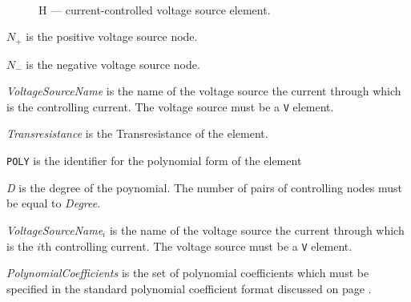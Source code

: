 
\begin{figure}[h]
\centering
\ 
\caption{H --- current-controlled voltage source element.}
\end{figure}


\begin{widelist}
\item[$N_{+}$] is the positive voltage source node.
\item[$N_{-}$] is the negative voltage source node.
\item[{\it VoltageSourceName}] is the name of the voltage source the current
through which is the controlling current. The voltage source must be a {\tt V}
element.
\item[{\it Transresistance}] is the Transresistance of the element.
\item[{\tt POLY}] is the identifier for the polynomial form of the element
\item[{\it D}] is the degree of the poynomial. The number of pairs of
           controlling nodes must be equal to {\it Degree}.
\item[{\it VoltageSourceName$_i$}] is the name of the voltage source the current
through which is the $i$th controlling current.
The voltage source must be a {\tt V} element.
\item[{\it PolynomialCoefficients}] is the set of polynomial coefficients
which must be specified in the standard polynomial coefficient format
discussed on page \pageref{section:poly}.
\end{widelist}


